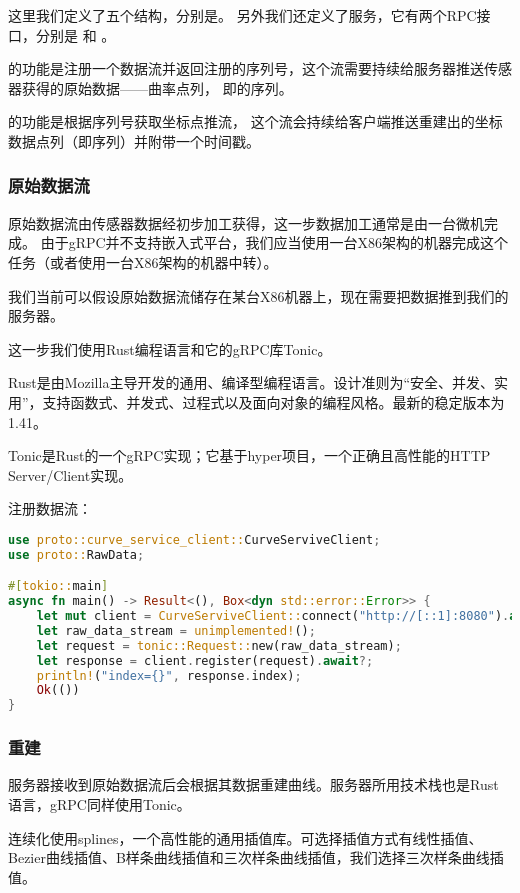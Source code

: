 这里我们定义了五个结构，分别是。
另外我们还定义了服务，它有两个RPC接口，分别是 和 。

的功能是注册一个数据流并返回注册的序列号，这个流需要持续给服务器推送传感器获得的原始数据——曲率点列，
即的序列。

的功能是根据序列号获取坐标点推流，
这个流会持续给客户端推送重建出的坐标数据点列（即序列）并附带一个时间戳。

\subsubsection{原始数据流}

原始数据流由传感器数据经初步加工获得，这一步数据加工通常是由一台微机完成。
由于gRPC并不支持嵌入式平台，我们应当使用一台X86架构的机器完成这个任务（或者使用一台X86架构的机器中转）。

我们当前可以假设原始数据流储存在某台X86机器上，现在需要把数据推到我们的服务器。

这一步我们使用Rust编程语言和它的gRPC库Tonic。

Rust是由Mozilla主导开发的通用、编译型编程语言。设计准则为“安全、并发、实用”，支持函数式、并发式、过程式以及面向对象的编程风格。最新的稳定版本为1.41。

Tonic是Rust的一个gRPC实现；它基于hyper项目，一个正确且高性能的HTTP Server/Client实现。

注册数据流：

\begin{lstlisting}[language=Rust]
use proto::curve_service_client::CurveServiveClient;
use proto::RawData;

#[tokio::main]
async fn main() -> Result<(), Box<dyn std::error::Error>> {
    let mut client = CurveServiveClient::connect("http://[::1]:8080").await?;
  	let raw_data_stream = unimplemented!();
    let request = tonic::Request::new(raw_data_stream);
    let response = client.register(request).await?;
    println!("index={}", response.index);
    Ok(())
}
\end{lstlisting}
\subsubsection{重建}

服务器接收到原始数据流后会根据其数据重建曲线。服务器所用技术栈也是Rust语言，gRPC同样使用Tonic。

连续化使用splines，一个高性能的通用插值库。可选择插值方式有线性插值、Bezier曲线插值、B样条曲线插值和三次样条曲线插值，我们选择三次样条曲线插值。

